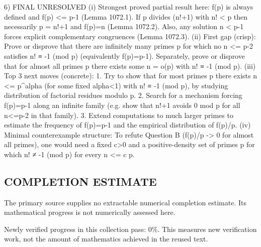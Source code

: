6) FINAL
UNRESOLVED
(i) Strongest proved partial result here: f(p) is always defined and f(p) <= p-1 (Lemma 1072.1). If p divides (n!+1) with n! < p then necessarily p = n!+1 and f(p)=n (Lemma 1072.2). Also, any solution n < p-1 forces explicit complementary congruences (Lemma 1072.3).
(ii) First gap (crisp): Prove or disprove that there are infinitely many primes p for which no n <= p-2 satisfies n! ≡ -1 (mod p) (equivalently f(p)=p-1). Separately, prove or disprove that for almost all primes p there exists some n = o(p) with n! ≡ -1 (mod p).
(iii) Top 3 next moves (concrete):
  1. Try to show that for most primes p there exists n <= p^alpha (for some fixed alpha<1) with n! ≡ -1 (mod p), by studying distribution of factorial residues modulo p.
  2. Search for a mechanism forcing f(p)=p-1 along an infinite family (e.g. show that n!+1 avoids 0 mod p for all n<=p-2 in that family).
  3. Extend computations to much larger primes to estimate the frequency of f(p)=p-1 and the empirical distribution of f(p)/p.
(iv) Minimal counterexample structure: To refute Question B (f(p)/p -> 0 for almost all primes), one would need a fixed c>0 and a positive-density set of primes p for which n! ≠ -1 (mod p) for every n <= c p.




\subsection*{COMPLETION ESTIMATE}
The primary source supplies no extractable numerical completion estimate. Its mathematical progress is not numerically assessed here.

Newly verified progress in this collection pass: $0\%$. This measures new verification work, not the amount of mathematics achieved in the reused text.
